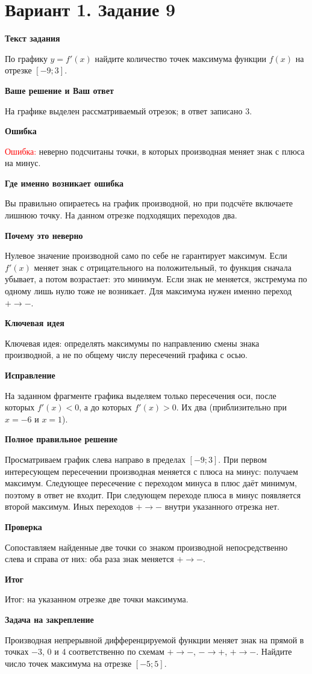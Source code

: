\documentclass[11pt,a4paper]{article}
\newcommand{\Part}[1]{\par\medskip\noindent\textbf{#1}\par\smallskip}
\newcommand{\Task}[2]{\clearpage\phantomsection\label{task:#1}\section*{#2}}
\newcommand{\Err}[1]{\textcolor{red}{Ошибка:} #1}
\newcommand{\Idea}[1]{\textcolor{blue!60!black}{Ключевая идея:} #1}
\newcommand{\Result}[1]{\textcolor{teal!60!black}{Итог:} #1}
\begin{document}
\Task{v19}{Вариант 1. Задание 9}
\Part{Текст задания}
По графику $y=f'(x)$ найдите количество точек максимума функции $f(x)$ на отрезке $[-9;3]$.
\Part{Ваше решение и Ваш ответ}
На графике выделен рассматриваемый отрезок; в ответ записано $3$.
\Part{Ошибка}
\Err{неверно подсчитаны точки, в которых производная меняет знак с плюса на минус.}
\Part{Где именно возникает ошибка}
Вы правильно опираетесь на график производной, но при подсчёте включаете лишнюю точку. На данном отрезке подходящих переходов два.
\Part{Почему это неверно}
Нулевое значение производной само по себе не гарантирует максимум. Если $f'(x)$ меняет знак с отрицательного на положительный, то функция сначала убывает, а потом возрастает: это минимум. Если знак не меняется, экстремума по одному лишь нулю тоже не возникает. Для максимума нужен именно переход $+\to-$.
\Part{Ключевая идея}
\Idea{определять максимумы по направлению смены знака производной, а не по общему числу пересечений графика с осью.}
\Part{Исправление}
На заданном фрагменте графика выделяем только пересечения оси, после которых $f'(x)<0$, а до которых $f'(x)>0$. Их два (приблизительно при $x=-6$ и $x=1$).
\Part{Полное правильное решение}
Просматриваем график слева направо в пределах $[-9;3]$. При первом интересующем пересечении производная меняется с плюса на минус: получаем максимум. Следующее пересечение с переходом минуса в плюс даёт минимум, поэтому в ответ не входит. При следующем переходе плюса в минус появляется второй максимум. Иных переходов $+\to-$ внутри указанного отрезка нет.
\Part{Проверка}
Сопоставляем найденные две точки со знаком производной непосредственно слева и справа от них: оба раза знак меняется $+\to-$.
\Part{Итог}
\Result{на указанном отрезке две точки максимума.}
\Part{Задача на закрепление}
Производная непрерывной дифференцируемой функции меняет знак на прямой в точках $-3$, $0$ и $4$ соответственно по схемам $+\to-$, $-\to+$, $+\to-$. Найдите число точек максимума на отрезке $[-5;5]$.
\end{document}
